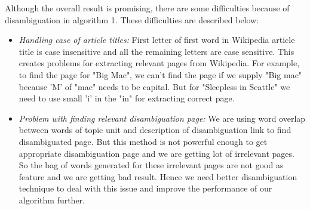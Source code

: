 \documentclass[12pt]{article}
\begin{document}
Although the overall result is promising, there are some difficulties because of disambiguation in algorithm 1. These difficulties are described below:

\begin{itemize}
\item \emph{Handling case of article titles:} First letter of first word in Wikipedia article title is case insensitive and all the remaining letters are case sensitive. This creates problems for extracting relevant pages from Wikipedia. For example, to find the page for "Big Mac", we can't find the page if we supply "Big mac" because 'M' of "mac" needs to be capital. But for "Sleepless in Seattle" we need to use small 'i' in the "in" for extracting correct page.

\item \emph{Problem with finding relevant disambiguation page:} We are using word overlap between words of topic unit and description of disambiguation link to find disambiguated page. But this method is not powerful enough to get appropriate disambiguation page and we are getting lot of irrelevant pages. So the bag of words generated for these irrelevant pages are not good as feature and we are getting bad result. Hence we need better disambiguation technique to deal with this issue and improve the performance of our algorithm further.  
\end{itemize}

 
 
\end{document}
